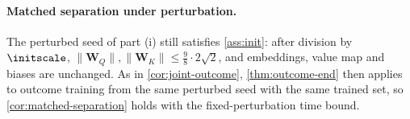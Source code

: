 \paragraph{Matched separation under perturbation.} The perturbed seed of part (i) still satisfies \cref{ass:init}: after division by
$\initscale$, $\|\mathbf W_Q\|,\|\mathbf W_K\|\le\frac98\cdot2\sqrt2$, and embeddings, value map and biases are unchanged. As in \cref{cor:joint-outcome},
\cref{thm:outcome-end} then applies to outcome training from the same perturbed seed with the same trained set, so
\cref{cor:matched-separation} holds with the fixed-perturbation time bound.
